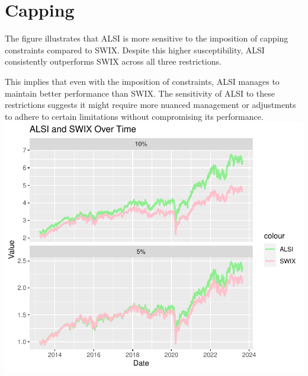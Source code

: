 \documentclass[11pt,preprint, authoryear]{elsarticle}
\numberwithin{equation}{section}
\numberwithin{figure}{section}
\numberwithin{table}{section}
\begin{document}
\hypertarget{capping}{%
\section{Capping}\label{capping}}

The figure illustrates that ALSI is more sensitive to the imposition of
capping constraints compared to SWIX. Despite this higher
susceptibility, ALSI consistently outperforms SWIX across all three
restrictions.

This implies that even with the imposition of constraints, ALSI manages
to maintain better performance than SWIX. The sensitivity of ALSI to
these restrictions suggests it might require more nuanced management or
adjustments to adhere to certain limitations without compromising its
performance.
\includegraphics{Question-3_files/figure-latex/unnamed-chunk-9-1.pdf}

\hfill

\newpage


\end{document}

